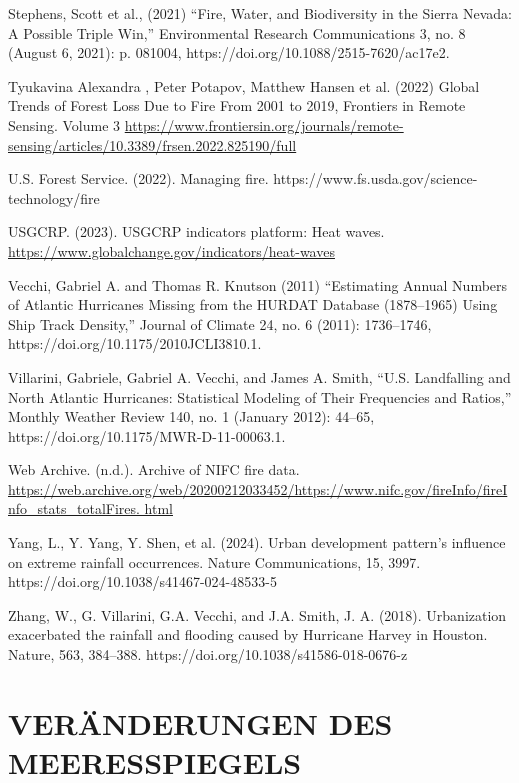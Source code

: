 \documentclass[12pt,paper=a4,DIV=12,parskip=never,chapterprefix=false,headings=standardclasses]{scrreprt}
\newcommand{\FigureNumbersByChapter}{%
  \counterwithout{figure}{section}%
  \counterwithin{figure}{chapter}%
}
\begin{document}
Stephens, Scott et al., (2021) “Fire, Water, and Biodiversity in the Sierra Nevada: A Possible Triple Win,”
Environmental Research Communications 3, no. 8 (August 6, 2021): p. 081004,
https://doi.org/10.1088/2515-7620/ac17e2.

Tyukavina Alexandra , Peter Potapov, Matthew Hansen et al. (2022) Global Trends of Forest Loss Due to
Fire From 2001 to 2019, Frontiers in Remote Sensing. Volume 3
\url{https://www.frontiersin.org/journals/remote-sensing/articles/10.3389/frsen.2022.825190/full}

U.S. Forest Service. (2022). Managing fire. https://www.fs.usda.gov/science-technology/fire

USGCRP. (2023). USGCRP indicators platform: Heat waves.
\url{https://www.globalchange.gov/indicators/heat-waves}

Vecchi, Gabriel A. and Thomas R. Knutson (2011) “Estimating Annual Numbers of Atlantic Hurricanes
Missing from the HURDAT Database (1878–1965) Using Ship Track Density,” Journal of Climate
24, no. 6 (2011): 1736–1746, https://doi.org/10.1175/2010JCLI3810.1.

Villarini, Gabriele, Gabriel A. Vecchi, and James A. Smith, “U.S. Landfalling and North Atlantic
Hurricanes: Statistical Modeling of Their Frequencies and Ratios,” Monthly Weather Review 140, no.
1 (January 2012): 44–65, https://doi.org/10.1175/MWR-D-11-00063.1.

Web Archive. (n.d.). Archive of NIFC fire data.
\url{https://web.archive.org/web/20200212033452/https://www.nifc.gov/fireInfo/fireInfo_stats_totalFires.
html}

Yang, L., Y. Yang, Y. Shen, et al. (2024). Urban development pattern’s influence on extreme rainfall
occurrences. Nature Communications, 15, 3997. https://doi.org/10.1038/s41467-024-48533-5

Zhang, W., G. Villarini, G.A. Vecchi, and J.A. Smith, J. A. (2018). Urbanization exacerbated the rainfall
and flooding caused by Hurricane Harvey in Houston. Nature, 563, 384–388.
https://doi.org/10.1038/s41586-018-0676-z
\endgroup


\cleardoublepage
\FigureNumbersByChapter 
\chapter{VERÄNDERUNGEN DES MEERESSPIEGELS}
\end{document}
